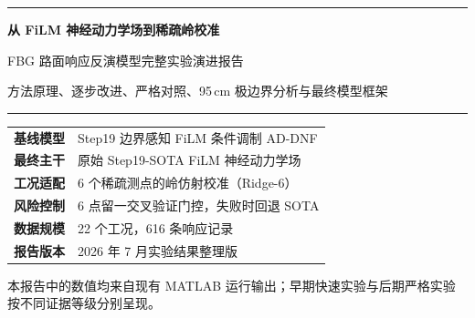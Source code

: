 \documentclass[11pt,a4paper]{article}
\begin{document}
\begin{titlepage}
  \centering
  \vspace*{17mm}
  {\color{Primary}\rule{\textwidth}{1.2pt}}\par
  \vspace{13mm}
  {\fontsize{25}{34}\selectfont\bfseries\color{Ink}
  从 FiLM 神经动力学场到稀疏岭校准\par}
  \vspace{5mm}
  {\fontsize{17}{24}\selectfont\color{Primary}
  FBG 路面响应反演模型完整实验演进报告\par}
  \vspace{8mm}
  {\large\color{Muted}
  方法原理、逐步改进、严格对照、95\,cm 极边界分析与最终模型框架\par}
  \vspace{13mm}
  {\color{Primary}\rule{\textwidth}{1.2pt}}\par

  \vfill
  \begin{tcolorbox}[width=0.88\textwidth,colback=Panel,colframe=Rule,boxrule=0.7pt,arc=2mm]
  \centering
  \begin{tabular}{>{\bfseries}p{32mm}p{83mm}}
  基线模型 & Step19 边界感知 FiLM 条件调制 AD-DNF\\
  最终主干 & 原始 Step19-SOTA FiLM 神经动力学场\\
  工况适配 & 6 个稀疏测点的岭仿射校准（Ridge-6）\\
  风险控制 & 6 点留一交叉验证门控，失败时回退 SOTA\\
  数据规模 & 22 个工况，616 条响应记录\\
  报告版本 & 2026 年 7 月实验结果整理版
  \end{tabular}
  \end{tcolorbox}
  \vfill
  {\small\color{Muted}
  本报告中的数值均来自现有 MATLAB 运行输出；早期快速实验与后期严格实验按不同证据等级分别呈现。}
\end{titlepage}
\end{document}
